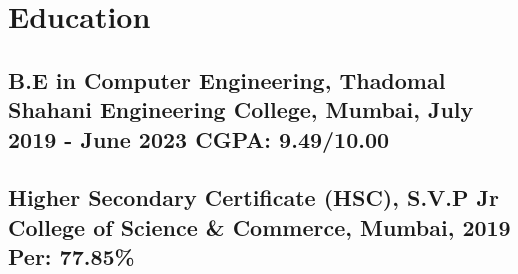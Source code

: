 \documentclass[a4,10pt]{article}
\newcommand{\subtext}[1]{
#1\par\vspace{-0.2cm}}
\newcommand{\hskills}[1]{
\textbf{\bfseries #1} }
\begin{document}



\section{Education }
\subsection*{B.E in Computer Engineering, {\normalsize \normalfont Thadomal Shahani Engineering College, Mumbai, July 2019 - June 2023} \hfill CGPA: 9.49/10.00} 
\vspace{0.1cm}
\subsection*{Higher Secondary Certificate (HSC), {\normalsize \normalfont S.V.P Jr College of Science \& Commerce, Mumbai, 2019} \hfill Per: 77.85\%} 
\vspace{0.1cm}
\end{document}
